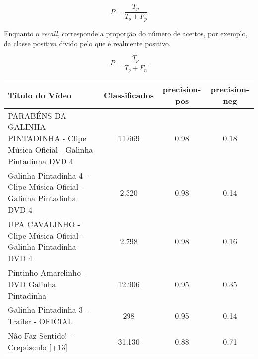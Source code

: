 
\begin{equation}
\label{eq:precision-descr}
 {P} = \frac{{T_p}}{{T_p}+{F_p}}
\end{equation}


Enquanto o \textit{recall}, corresponde a proporção do número de acertos, por exemplo, da classe positiva divido pelo que é realmente positivo.

\begin{equation}
\label{eq:recall-descr}
 {P} = \frac{{T_p}}{{T_p}+{F_n}}
\end{equation}

\begin{table}[H]
	
\begin{tabular}{|p{5.5cm}|c|c|c|}
\hline
\textbf{Título do Vídeo} & \textbf{Classificados} & \textbf{precision-pos} & \textbf{precision-neg} \\ \hline
PARABÉNS DA GALINHA PINTADINHA - Clipe Música Oficial - Galinha Pintadinha DVD 4 & 11.669 & 0.98 & 0.18 \\ \hline
Galinha Pintadinha 4 - Clipe Música Oficial - Galinha Pintadinha DVD 4 & 2.320 & 0.98 & 0.14 \\ \hline
UPA CAVALINHO - Clipe Música Oficial - Galinha Pintadinha DVD 4 & 2.798 & 0.98 & 0.16 \\ \hline
Pintinho Amarelinho - DVD Galinha Pintadinha & 12.906 & 0.95 & 0.35 \\ \hline
Galinha Pintadinha 3 - Trailer - OFICIAL & 298 & 0.95 & 0.14 \\ \hline
Não Faz Sentido! - Crepúsculo [+13] & 31.130 & 0.88 & 0.71\\ \hline
\end{tabular}

\end{table}

